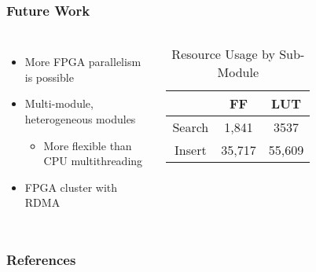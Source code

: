 \documentclass{beamer}
\begin{document}
\begin{frame}
	\frametitle{Future Work}
	\begin{columns}
		\begin{itemize}
			\item More FPGA parallelism is possible
			\item Multi-module, heterogeneous modules
			\begin{itemize}
				\item More flexible than CPU multithreading
			\end{itemize}
			\item FPGA cluster with RDMA
		\end{itemize}

		\begin{table}
			\begin{tabular}{c|cc}
				& FF & LUT \\
				\hline
				Search & 1,841 & 3537 \\
				Insert & 35,717 & 55,609 \\
			\end{tabular}
			\caption{Resource Usage by Sub-Module}
		\end{table}
	\end{columns}
\end{frame}


\begin{frame}
	\frametitle{References}
	\printbibliography
\end{frame}
\end{document}
